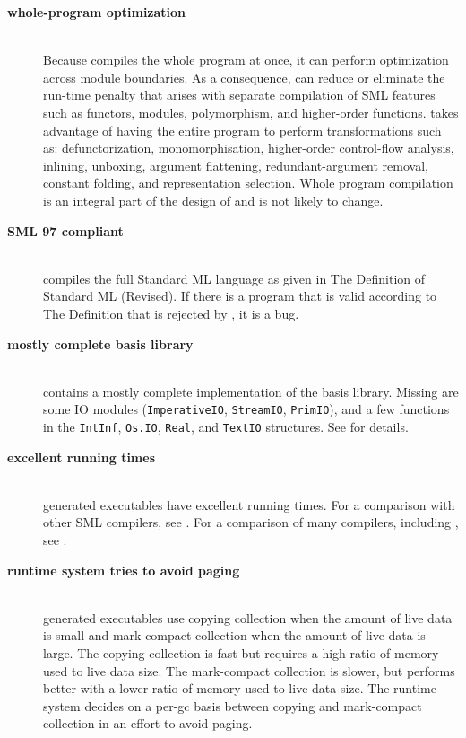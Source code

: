 
\newcommand{\feature}[1]{\item[\bf #1]\hspace{1in}\\}
\begin{description}
\feature{whole-program optimization}
Because {\mlton} compiles the whole program at once, it can perform optimization
across module boundaries.  As a consequence, {\mlton} can reduce or eliminate
the run-time penalty that arises with separate compilation of SML features such
as functors, modules, polymorphism, and higher-order functions.  {\mlton} takes
advantage of having the entire program to perform transformations such as:
defunctorization, monomorphisation, higher-order control-flow analysis,
inlining, unboxing, argument flattening, redundant-argument removal, constant
folding, and representation selection.  Whole program compilation is an integral
part of the design of {\mlton} and is not likely to change.

\feature{SML 97 compliant}
{\mlton} compiles the full Standard ML language as given in The
Definition of Standard ML (Revised)\cite{MTHM97}.  If there is a
program that is valid according to The Definition that is rejected by
{\mlton}, it is a bug.

\feature{mostly complete basis library}
{\mlton} contains a mostly complete implementation of the basis library.
Missing are some IO modules ({\tt ImperativeIO}, {\tt StreamIO},
{\tt PrimIO}), and a few functions in the {\tt IntInf}, {\tt Os.IO}, {\tt Real},
and {\tt TextIO} structures.  See  for details.

\feature{excellent running times}
{\mlton} generated executables have excellent running times.
For a comparison with other SML compilers, see
.
For a comparison of many compilers, including {\mlton}, see
.

\feature{runtime system tries to avoid paging}
{\mlton} generated executables use copying collection when the amount
of live data is small and mark-compact collection when the amount of
live data is large.  The copying collection is fast but requires a
high ratio of memory used to live data size.  The mark-compact
collection is slower, but performs better with a lower ratio of memory
used to live data size.  The runtime system decides on a per-gc basis 
between copying and mark-compact collection in an effort to avoid
paging.


\end{description}
